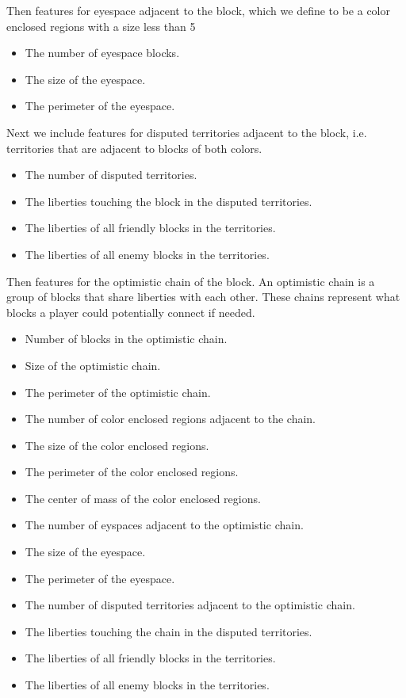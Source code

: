 \documentclass[11pt,letterpaper]{article}
\begin{document}
Then features for eyespace adjacent to the block, which we define to be a color enclosed regions with a size less
than 5
\begin{itemize}
  \item The number of eyespace blocks.
  \item The size of the eyespace.
  \item The perimeter of the eyespace.
\end{itemize}
Next we include features for disputed territories adjacent to the block, i.e. territories that are adjacent to blocks of
both colors.
\begin{itemize}
  \item The number of disputed territories.
  \item The liberties touching the block in the disputed territories.
  \item The liberties of all friendly blocks in the territories.
  \item The liberties of all enemy blocks in the territories.
\end{itemize}
Then features for the optimistic chain of the block. An optimistic chain is a group of blocks that share liberties with
each other. These chains represent what blocks a player could potentially connect if needed.
\begin{itemize}
  \item Number of blocks in the optimistic chain.
  \item Size of the optimistic chain.
  \item The perimeter of the optimistic chain.
  \item The number of color enclosed regions adjacent to the chain.
  \item The size of the color enclosed regions.
  \item The perimeter of the color enclosed regions.
  \item The center of mass of the color enclosed regions.
  \item The number of eyspaces adjacent to the optimistic chain.
  \item The size of the eyespace.
  \item The perimeter of the eyespace.
  \item The number of disputed territories adjacent to the optimistic chain.
  \item The liberties touching the chain in the disputed territories.
  \item The liberties of all friendly blocks in the territories.
  \item The liberties of all enemy blocks in the territories.
\end{itemize}
\end{document}
